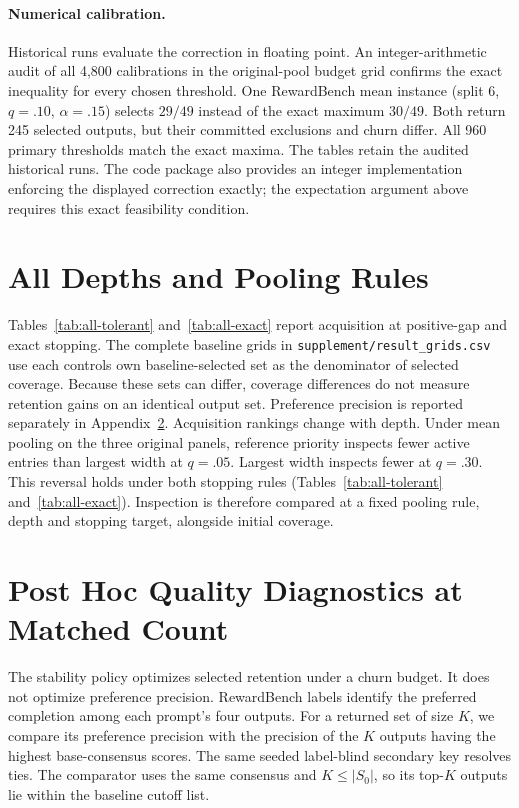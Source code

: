 \paragraph{Numerical calibration.}
Historical runs evaluate the correction in floating point. An integer-arithmetic audit of all 4,800 calibrations in the original-pool budget grid confirms the exact inequality for every chosen threshold. One RewardBench mean instance (split 6, $q=.10$, $\alpha=.15$) selects $29/49$ instead of the exact maximum $30/49$. Both return 245 selected outputs, but their committed exclusions and churn differ. All 960 primary thresholds match the exact maxima. The tables retain the audited historical runs. The code package also provides an integer implementation enforcing the displayed correction exactly; the expectation argument above requires this exact feasibility condition.



\section{All Depths and Pooling Rules}
Tables~\ref{tab:all-tolerant} and~\ref{tab:all-exact} report acquisition at positive-gap and exact stopping. The complete baseline grids in \nolinkurl{supplement/result_grids.csv} use each control\textquotesingle s own baseline-selected set as the denominator of selected coverage. Because these sets can differ, coverage differences do not measure retention gains on an identical output set. Preference precision is reported separately in Appendix~\ref{app:quality}. Acquisition rankings change with depth. Under mean pooling on the three original panels, reference priority inspects fewer active entries than largest width at $q=.05$. Largest width inspects fewer at $q=.30$. This reversal holds under both stopping rules (Tables~\ref{tab:all-tolerant} and~\ref{tab:all-exact}). Inspection is therefore compared at a fixed pooling rule, depth and stopping target, alongside initial coverage.



\section{Post Hoc Quality Diagnostics at Matched Count}
\label{app:quality}
The stability policy optimizes selected retention under a churn budget. It does not optimize preference precision. RewardBench labels identify the preferred completion among each prompt's four outputs. For a returned set of size $K$, we compare its preference precision with the precision of the $K$ outputs having the highest base-consensus scores. The same seeded label-blind secondary key resolves ties. The comparator uses the same consensus and $K\le|S_0|$, so its top-$K$ outputs lie within the baseline cutoff list. 

